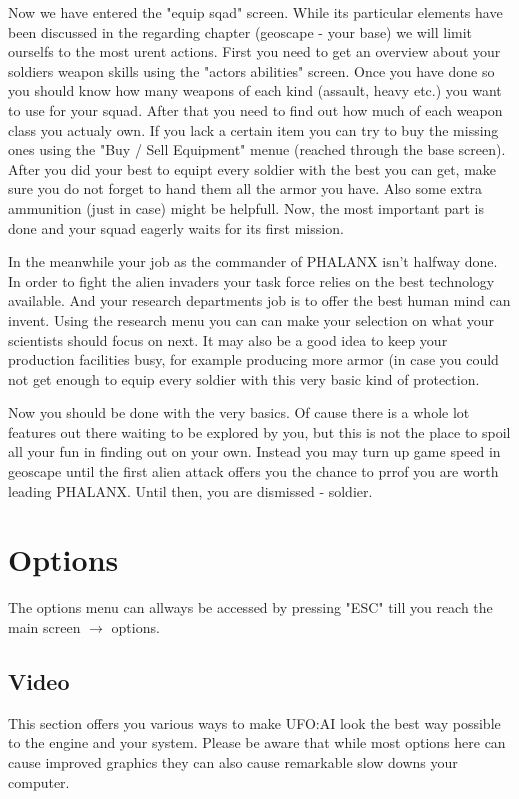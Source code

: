 Now we have entered the "equip sqad" screen. While its particular elements have been discussed in the regarding chapter (geoscape - your base) we will limit ourselfs to the most urent actions. First you need to get an overview about your soldiers weapon skills using the "actors abilities" screen. Once you have done so you should know how many weapons of each kind (assault, heavy etc.) you want to use for your squad. After that you need to find out how much of each weapon class you actualy own. If you lack a certain item you can try to buy the missing ones using the "Buy / Sell Equipment" menue (reached through the base screen). After you did your best to equipt every soldier with the best you can get, make sure you do not forget to hand them all the armor you have. Also some extra ammunition (just in case) might be helpfull. Now, the most important part is done and your squad eagerly waits for its first mission.

In the meanwhile your job as the commander of PHALANX isn't halfway done. In order to fight the alien invaders your task force relies on the best technology available. And your research departments job is to offer the best human mind can invent. Using the research menu you can can make your selection on what your scientists should focus on next. It may also be a good idea to keep your production facilities busy, for example producing more armor (in case you could not get enough to equip every soldier with this very basic kind of protection.

Now you should be done with the very basics. Of cause there is a whole lot features out there waiting to be explored by you, but this is not the place to spoil all your fun in finding out on your own. Instead you may turn up game speed in geoscape until the first alien attack offers you the chance to prrof you are worth leading PHALANX. Until then, you are dismissed - soldier.

\section{Options}
The options menu can allways be accessed by pressing "ESC" till you reach the main screen $\rightarrow$ options.

\subsection{Video}
This section offers you various ways to make UFO:AI look the best way possible to the engine and your system. Please be aware that while most options here can cause improved graphics they can also cause remarkable slow downs your computer.
